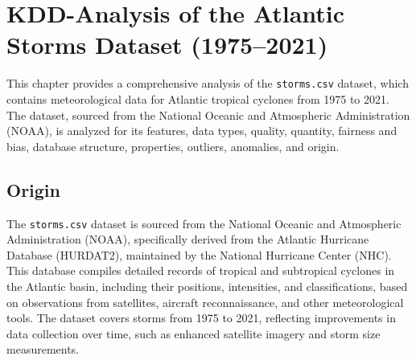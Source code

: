 %
%
%

\chapter{KDD-Analysis of the Atlantic Storms Dataset (1975--2021)}
This chapter provides a comprehensive analysis of the \texttt{storms.csv} dataset, which contains meteorological data for Atlantic tropical cyclones from 1975 to 2021. The dataset, sourced from the National Oceanic and Atmospheric Administration (NOAA), is analyzed for its features, data types, quality, quantity, fairness and bias, database structure, properties, outliers, anomalies, and origin.

\section{Origin}
The \texttt{storms.csv} dataset is sourced from the National Oceanic and Atmospheric Administration (NOAA), specifically derived from the Atlantic Hurricane Database (HURDAT2), maintained by the National Hurricane Center (NHC). This database compiles detailed records of tropical and subtropical cyclones in the Atlantic basin, including their positions, intensities, and classifications, based on observations from satellites, aircraft reconnaissance, and other meteorological tools. The dataset covers storms from 1975 to 2021, reflecting improvements in data collection over time, such as enhanced satellite imagery and storm size measurements.


